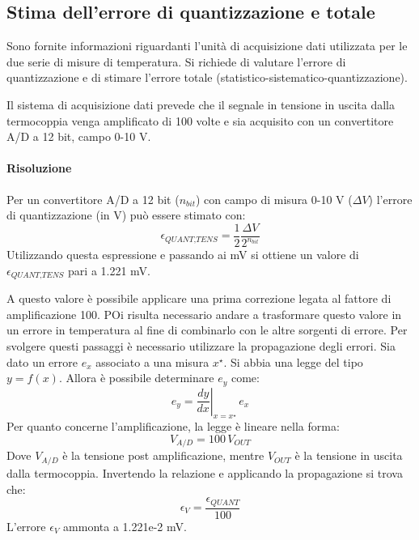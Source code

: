 \clearpage
\subsection{Stima dell'errore di quantizzazione e totale}
Sono fornite informazioni riguardanti l'unità di acquisizione dati utilizzata per le due serie di misure di temperatura. Si richiede di valutare l'errore di quantizzazione e di stimare l'errore totale (statistico-sistematico-quantizzazione).

Il sistema di acquisizione dati prevede che il segnale in tensione in uscita dalla termocoppia venga amplificato di 100 volte e sia acquisito con un convertitore A/D a 12 bit, campo 0-10 V.

\paragraph{Risoluzione}
Per un convertitore A/D a 12 bit ($n_{bit}$) con campo di misura 0-10 V ($\Delta V$) l'errore di quantizzazione (in V) può essere stimato con: 
\begin{equation}
	\epsilon_{\textit{QUANT,TENS}} = \frac{1}{2} \frac{\Delta V}{2^{n_{bit}}}
\end{equation}
Utilizzando questa espressione e passando ai mV si ottiene un valore di $	\epsilon_{\textit{QUANT,TENS}} $ pari a 1.221 mV. 

A questo valore è possibile applicare una prima correzione legata al fattore di amplificazione 100. POi risulta necessario andare a trasformare questo valore in un errore in temperatura al fine di combinarlo con le altre sorgenti di errore. 
Per svolgere questi passaggi è necessario utilizzare la propagazione degli errori. Sia dato un errore $e_x$ associato a una misura $x^\star$. Si abbia una legge del tipo $y=f(x)$. Allora è possibile determinare $e_y$ come:
\begin{equation}
	e_y = \left. \frac{dy}{dx} \right\vert _{x=x^\star} \, e_x
\end{equation}
Per quanto concerne l'amplificazione, la legge è lineare nella forma:
\begin{equation}
	V_{A/D} = 100\, V_{OUT}
\end{equation}
Dove $V_{A/D}$ è la tensione post amplificazione, mentre $V_{OUT}$ è la tensione in uscita dalla termocoppia. Invertendo la relazione e applicando la propagazione si trova che:
\begin{equation}
	\epsilon_{\textit{V}} = \frac{\epsilon_{\textit{QUANT}}}{100}
\end{equation}
L'errore $\epsilon_{\textit{V}}$ ammonta a 1.221e-2 mV.

